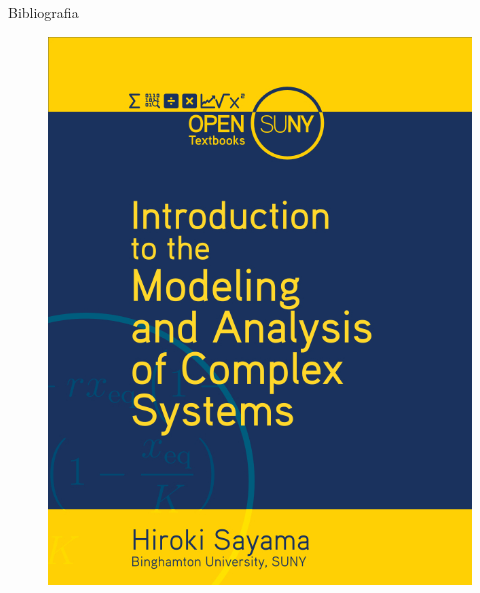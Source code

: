 \documentclass[12pt,mathserif,aspectratio=169]{beamer}
\begin{document}
\begin{frame}{Bibliografia}
    \begin{center}
        \begin{minipage}{0.25\textwidth}
            \begin{figure}
                \includegraphics[width=0.25\paperwidth]{fig/textbook1.jpg}
            \end{figure}
        \end{minipage}
        \hspace{0.5cm}
        \begin{minipage}{0.25\textwidth}
            \begin{figure}

\end{figure}
\end{minipage}
\end{center}
\end{frame}
\end{document}
